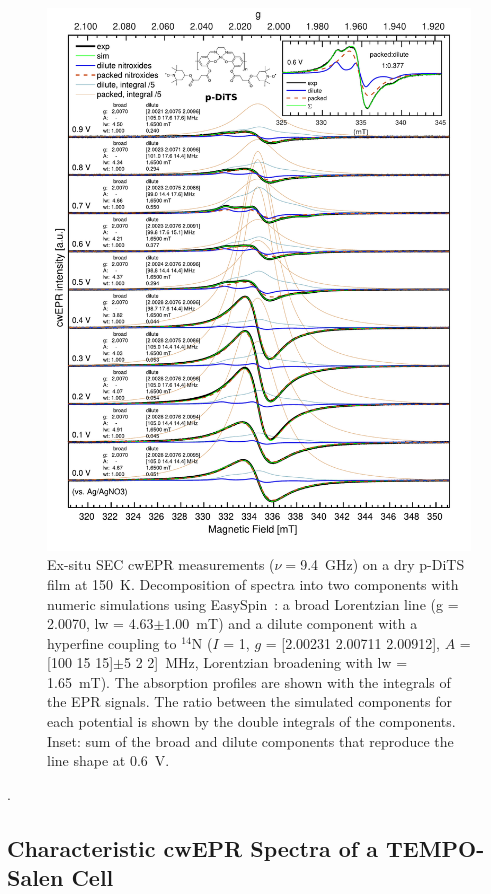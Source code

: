 \begin{figure}[h]
\center
	\includegraphics[width=1\textwidth]{./operando_epr/figures/CRYO/Figure_S7_new.pdf}
	\caption{Ex-situ SEC cwEPR measurements ($\nu=$9.4~GHz) on a dry p-DiTS film at 150~K. Decomposition of spectra into two components with numeric simulations using EasySpin~\cite{Stoll_2006}: a broad Lorentzian line (g = 2.0070, lw = 4.63$\pm$1.00~mT) and a dilute component with a hyperfine coupling to $^{14}$N ($I$ = 1, $g$ = [2.00231 2.00711 2.00912], $A$ = [100 15 15]$\pm$5 2 2]~MHz, Lorentzian broadening with lw = 1.65~mT). The absorption profiles are shown with the integrals of the EPR signals. The ratio between the simulated components for each potential is shown by the double integrals of the components. Inset: sum of the broad and dilute components that reproduce the line shape at 0.6~V.\\}
	\label{fig:cwEPR_CRYO_DiTS_CHG_SIM}
\end{figure}

\newpage
.
\subsection{Characteristic cwEPR Spectra of a TEMPO-Salen Cell}

